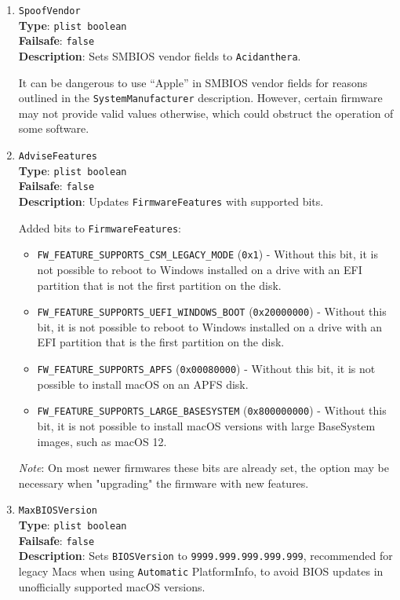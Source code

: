 \documentclass[]{article}
\begin{document}
\begin{enumerate}
\item
  \texttt{SpoofVendor}\\
  \textbf{Type}: \texttt{plist\ boolean}\\
  \textbf{Failsafe}: \texttt{false}\\
  \textbf{Description}: Sets SMBIOS vendor fields to \texttt{Acidanthera}.

  It can be dangerous to use ``Apple'' in SMBIOS vendor fields for reasons outlined in the
  \texttt{SystemManufacturer} description. However, certain firmware may not provide
  valid values otherwise, which could obstruct the operation of some software.

\item
  \texttt{AdviseFeatures}\\
  \textbf{Type}: \texttt{plist\ boolean}\\
  \textbf{Failsafe}: \texttt{false}\\
  \textbf{Description}: Updates \texttt{FirmwareFeatures} with supported bits.

  Added bits to \texttt{FirmwareFeatures}:

  \begin{itemize}
    \item \texttt{FW\_FEATURE\_SUPPORTS\_CSM\_LEGACY\_MODE} (\texttt{0x1})
    - Without this bit, it is not possible to reboot to Windows installed on
      a drive with an EFI partition that is not the first partition on the disk.
    \item \texttt{FW\_FEATURE\_SUPPORTS\_UEFI\_WINDOWS\_BOOT} (\texttt{0x20000000})
    - Without this bit, it is not possible to reboot to Windows installed on
      a drive with an EFI partition that is the first partition on the disk.
    \item \texttt{FW\_FEATURE\_SUPPORTS\_APFS} (\texttt{0x00080000})
    - Without this bit, it is not possible to install macOS on an APFS disk.
    \item \texttt{FW\_FEATURE\_SUPPORTS\_LARGE\_BASESYSTEM} (\texttt{0x800000000})
    - Without this bit, it is not possible to install macOS versions with large
      BaseSystem images, such as macOS 12.
  \end{itemize}

  \emph{Note}: On most newer firmwares these bits are already set, the option
  may be necessary when "upgrading" the firmware with new features.

\item
  \texttt{MaxBIOSVersion}\\
  \textbf{Type}: \texttt{plist\ boolean}\\
  \textbf{Failsafe}: \texttt{false}\\
  \textbf{Description}: Sets \texttt{BIOSVersion} to \texttt{9999.999.999.999.999}, recommended for legacy
  Macs when using \texttt{Automatic} PlatformInfo, to avoid BIOS updates in unofficially supported macOS
  versions.


\end{enumerate}
\end{document}
